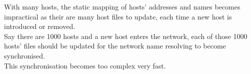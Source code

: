 With many hosts, the static mapping of hosts' addresses and names becomes impractical as their are many host files to update, each time a new host is introduced or removed.\\
Say there are 1000 hosts and a new host enters the network, each of those 1000 hosts' files should be updated for the network name resolving to become synchronised.\\ This synchronisation becomes too complex very fast.